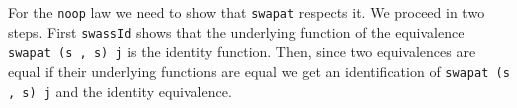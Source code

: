\begin{code}
\AgdaOperator{\AgdaFunction{]\%=\AgdaUnderscore{}}}\AgdaSymbol{)}\AgdaSpace{}%
\AgdaSpace{}%
\<%
\\
\>[8][@{}l@{\AgdaIndent{0}}]%
\>[10]\AgdaSpace{}%
\AgdaOperator{\AgdaFunction{[}}\AgdaSpace{}%
\AgdaSpace{}%
\AgdaOperator{\AgdaFunction{]\%=}}\AgdaSpace{}%
\<%
\\
%
\>[8]\AgdaSpace{}%
\AgdaSpace{}%
\AgdaSpace{}%
\AgdaSpace{}%
\<%
\\
%
\\[\AgdaEmptyExtraSkip]%
\>[0]\AgdaSpace{}%
\AgdaSymbol{:}\AgdaSpace{}%
\AgdaSymbol{(}\AgdaSpace{}%
\AgdaSpace{}%
\AgdaSymbol{)}\AgdaSpace{}%
\AgdaSpace{}%
\AgdaSpace{}%
\AgdaSpace{}%
\AgdaSpace{}%
\AgdaSpace{}%
\AgdaSpace{}%
\<%
\\
\>[0]\AgdaSpace{}%
\AgdaSymbol{(}\AgdaSpace{}%
\AgdaOperator{\AgdaInductiveConstructor{,}}\AgdaSpace{}%
\AgdaSymbol{)}\AgdaSpace{}%
\AgdaSpace{}%
\AgdaSymbol{=}\AgdaSpace{}%
\AgdaSpace{}%
\AgdaSymbol{(}\AgdaSpace{}%
\AgdaSymbol{(}\AgdaSpace{}%
\AgdaSpace{}%
\AgdaSpace{}%
\AgdaSymbol{)}\AgdaSpace{}%
\AgdaSymbol{(}\AgdaSpace{}%
\AgdaSpace{}%
\AgdaSpace{}%
\AgdaSymbol{)}\AgdaSpace{}%
\AgdaSymbol{(}\AgdaSpace{}%
\AgdaSpace{}%
\AgdaSpace{}%
\AgdaSymbol{)}\AgdaSpace{}%
\AgdaSymbol{(}\AgdaSpace{}%
\AgdaSpace{}%
\AgdaSpace{}%
\AgdaSymbol{))}\<%
\end{code}

For the \texttt{noop} law we need to show that \texttt{swapat} respects it.
We proceed in two steps. First \texttt{swassId} shows that the underlying function of the equivalence
\texttt{swapat (s , s) j} is the identity function. Then, since two equivalences are equal if their
underlying functions are equal we get an identification of \texttt{swapat (s , s) j} and the identity equivalence.

